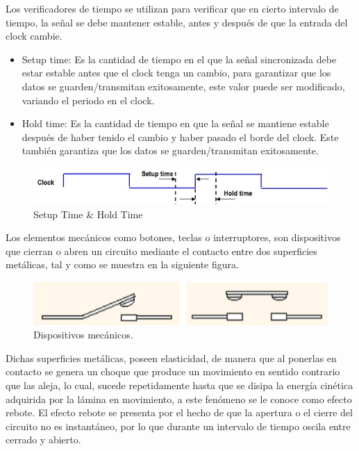 \documentclass[journal,trans]{IEEEtran}
\begin{document}
	Los verificadores de tiempo se utilizan para verificar que en cierto intervalo de tiempo, la señal se debe mantener estable, antes y después de que la entrada del clock cambie.
	
	\vspace{10mm}
	
	\begin{itemize}
		\item Setup time: Es la cantidad de tiempo en el que la señal sincronizada debe estar estable antes que el clock tenga un cambio, para garantizar que los datos se guarden/transmitan exitosamente, este valor puede ser modificado, variando el periodo en el clock.
		\item Hold time: Es la cantidad de tiempo en que la señal se mantiene estable después de haber tenido el cambio y haber pasado el borde del clock. Este también garantiza que los datos se guarden/transmitan exitosamente. 
	\end{itemize}
	
	\begin{figure}[h]
		\centering
		\includegraphics[width=\linewidth]{./imagenes/setup_hold.jpg}
		\caption{Setup Time \& Hold Time}
		\label{fig:setup-time}
	\end{figure}


	Los elementos mecánicos como botones, teclas o interruptores, son dispositivos que cierran o abren un circuito mediante el contacto entre dos superficies metálicas, tal y como se muestra en la siguiente figura.

	\begin{figure}[hbtp]
		\centering
		\includegraphics[scale = 0.4]{imagenes/rebote.png}
		\caption[Figura1]{Dispositivos mecánicos.}
		\label{fig:DispMeca}
	\end{figure}
	
	Dichas superficies metálicas, poseen elasticidad, de manera que al ponerlas en contacto se genera un choque que produce un movimiento en sentido contrario que las aleja, lo cual, sucede repetidamente hasta que se disipa la energía cinética adquirida por la lámina en movimiento, a este fenómeno se le conoce como efecto rebote.
	El efecto rebote se presenta por el hecho de que la apertura o el cierre del circuito no es instantáneo, por lo que durante un intervalo de tiempo oscila entre cerrado y abierto.
	
\end{document}
